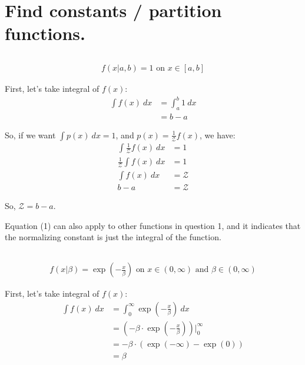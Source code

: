 \newcommand\chapternumber{2}

\usepackage{enumerate}
\usepackage{float}



\section{Find constants / partition functions.}
\subsection{}
\begin{align*}
    f(x|a,b) = 1 \text{ on } x \in [a,b]
\end{align*}

First, let's take integral of $f(x)$:
\begin{align*}
    \int f(x) \ dx
    &= \int_a^b 1 \ dx\\
    &= b-a
\end{align*}

So, if we want $\int p(x) \ dx = 1$, and $p(x) = \frac{1}{\mathcal{Z}} f(x)$, we have:
\begin{align}
    \int \frac{1}{\mathcal{Z}} f(x) \ dx&= 1 \nonumber \\
    \frac{1}{\mathcal{Z}} \int  f(x) \ dx&= 1 \nonumber \\
    \int f(x) \ dx&= \mathcal{Z}  \\
    b-a &= \mathcal{Z} \nonumber 
\end{align}

So, $\mathcal{Z} = b-a$. 

Equation (1) can also apply to other functions in question 1, and it indicates that the normalizing constant is just the integral of the function.

\subsection{}
\begin{align*}
    f(x|\beta) = \exp(-\frac{x}{\beta}) \text{ on } x \in (0,\infty) \text{ and } \beta \in (0, \infty)
\end{align*}

First, let's take integral of $f(x)$:
\begin{align*}
    \int f(x) \ dx
    &= \int_0^{\infty} \exp(-\frac{x}{\beta})\ dx \\
    &= (-\beta \cdot \exp(-\frac{x}{\beta})) \biggr\rvert _0^{\infty} \\
    &= -\beta \cdot (\exp(-\infty)-\exp(0)) \\
    &= \beta 
\end{align*}

